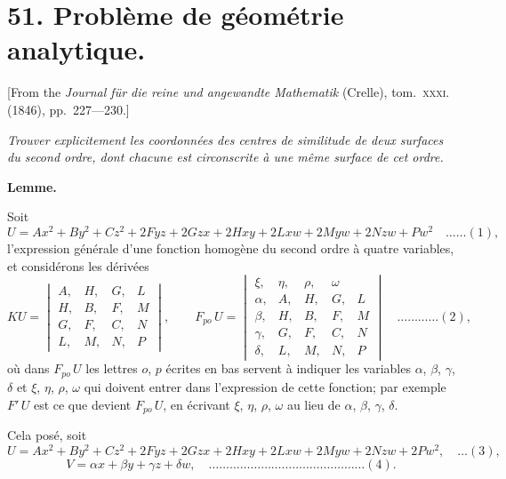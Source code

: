 \documentclass[12pt,a4paper]{article}
\theoremstyle{plain}
\begin{document}
\newpage


\section*{51. Probl\`eme de g\'eom\'etrie analytique.}

[From the \textit{Journal f\"ur die reine und angewandte Mathematik} (Crelle), tom.~\textsc{xxxi}. (1846), pp.~227---230.]

\bigskip

\textit{Trouver explicitement les coordonn\'ees des centres de similitude de deux surfaces du second ordre, dont chacune est circonscrite \`a une m\^eme surface de cet ordre.}

\medskip
\textbf{Lemme.}

Soit
\[
U = Ax^2 + By^2 + Cz^2 + 2Fyz + 2Gzx + 2Hxy + 2Lxw + 2Myw + 2Nzw + Pw^2 \quad \ldots \ldots (1),
\]
l'expression g\'en\'erale d'une fonction homog\`ene du second ordre \`a quatre variables, et consid\'erons les d\'eriv\'ees
\[
KU = \begin{vmatrix}
A, & H, & G, & L \\
H, & B, & F, & M \\
G, & F, & C, & N \\
L, & M, & N, & P
\end{vmatrix}, \qquad
F_{po}\, U = \begin{vmatrix}
\xi, & \eta, & \rho, & \omega \\
\alpha, & A, & H, & G, & L \\
\beta, & H, & B, & F, & M \\
\gamma, & G, & F, & C, & N \\
\delta, & L, & M, & N, & P
\end{vmatrix} \quad \ldots \ldots \ldots \ldots (2),
\]
o\`u dans $F_{po}\, U$ les lettres $o$, $p$ \'ecrites en bas servent \`a indiquer les variables $\alpha$, $\beta$, $\gamma$, $\delta$ et $\xi$, $\eta$, $\rho$, $\omega$ qui doivent entrer dans l'expression de cette fonction; par exemple $F'\, U$ est ce que devient $F_{po}\, U$, en \'ecrivant $\xi$, $\eta$, $\rho$, $\omega$ au lieu de $\alpha$, $\beta$, $\gamma$, $\delta$.

Cela pos\'e, soit
\[
U = Ax^2 + By^2 + Cz^2 + 2Fyz + 2Gzx + 2Hxy + 2Lxw + 2Myw + 2Nzw + 2Pw^2, \quad \ldots (3),
\]
\[
V = \alpha x + \beta y + \gamma z + \delta w, \quad \ldots \ldots \ldots \ldots \ldots \ldots \ldots \ldots \ldots \ldots \ldots \ldots \ldots \ldots \ldots (4).
\]
\end{document}

